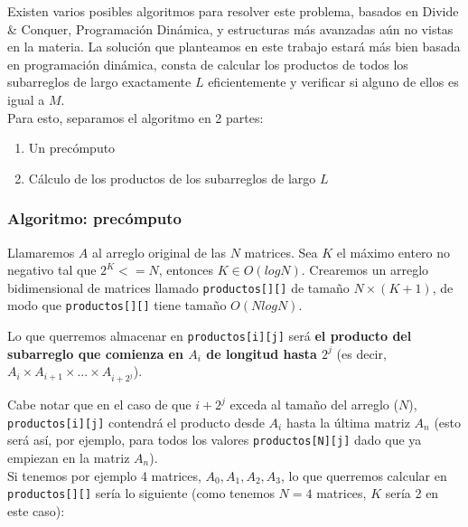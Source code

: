 Existen varios posibles algoritmos para resolver este problema, basados en Divide \& Conquer, 
Programación Dinámica, y estructuras más avanzadas aún no vistas en la materia. La solución que 
planteamos en este trabajo estará más bien basada en programación dinámica, consta de calcular 
los productos de 
todos los subarreglos de largo exactamente $L$ eficientemente y verificar si alguno de ellos 
es igual a $M$. \\

Para esto, separamos el algoritmo en 2 partes:
\begin{enumerate}
\item Un precómputo 
\item Cálculo de los productos de los subarreglos de largo $L$
\end{enumerate}

\subsubsection{Algoritmo: precómputo}

Llamaremos $A$ al arreglo original de las $N$ matrices. 
Sea $K$ el máximo entero no negativo tal que $2^K <= N$, entonces $K \in O(log N)$. Crearemos un arreglo 
bidimensional de matrices llamado \texttt{productos[][]} de tamaño $N \times (K+1)$, de modo que 
\texttt{productos[][]} tiene tamaño $O(N log N)$. 

Lo que querremos almacenar en \texttt{productos[i][j]} será \textbf{el producto del subarreglo que 
comienza en $A_i$ de longitud hasta $2^j$} (es decir, $A_i \times A_{i+1} \times ... \times A_{i+2^j}$). 

Cabe notar que en el caso de que $i+2^j$ exceda al tamaño del arreglo ($N$), 
\texttt{productos[i][j]} contendrá el producto desde $A_i$ hasta 
la última matriz $A_n$ (esto será así, por ejemplo, para todos los valores \texttt{productos[N][j]} dado 
que ya empiezan en la matriz $A_n$). \\

Si tenemos por ejemplo 4 matrices, $A_0, A_1, A_2, A_3$, lo que 
querremos calcular en \texttt{productos[][]} sería lo siguiente (como tenemos $N=4$ 
matrices, $K$ sería 2 en este caso):\\

